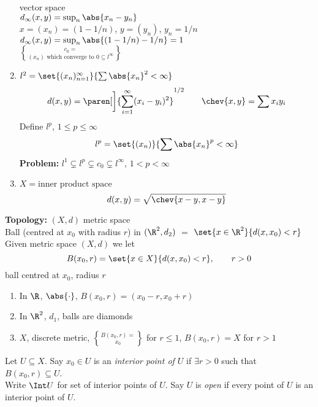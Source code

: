 \begin{enumerate}
vector space \\
$d_\infty(x,y)=\sup_n\abs{x_n-y_n}$ \\
\ex $x=(x_n)=(1-1/n)$, $y=(y_n)$, $y_n=1/n$ \\
$d_\infty(x,y)=\sup_n\abs{(1-1/n)-1/n}=1$ \\
$c_0=\brace{\text{$(x_n)$ which converge to $0$}}\subseteq l^\infty$
\item $l^2 = \set{(x_n)_{n=1}^\infty}{\vphantom{\bigm|}\smash{\sum\abs{x_n}^2<\infty}}$ \\
\[ d(x,y) = \paren[\bigg]{\sum_{i=1}^\infty(x_i-y_i)^2}^{1/2} \qquad \chev{x,y}=\sum x_iy_i \]
Define $l^p$, $1\leq p\leq \infty$
\[ l^p = \set{(x_n)}{\sum\abs{x_n}^p<\infty} \]
\textbf{Problem:} $l^1\subsetneq l^p\subsetneq c_0\subsetneq l^\infty$, $1<p<\infty$
\item $X=\text{inner product space}$
\[ d(x,y) = \sqrt{\chev{x-y,x-y}} \]
\end{enumerate}

\textbf{Topology:} $(X,d)$ metric space \\
Ball (centred at $x_0$ with radius $r$) in $(\R^2,d_2)$ $=$ $\set{x\in\R^2}{d(x,x_0)<r}$ \\
 Given metric space $(X,d)$ we let
\[ B(x_0,r) = \set{x\in X}{d(x,x_0)<r}, \qquad r>0 \]
ball centred at $x_0$, radius $r$

\ex
\begin{enumerate}
\item In $\R$, $\abs{\cdot}$, \quad $B(x_0,r)=(x_0-r,x_0+r)$
\item In $\R^2$, $d_1$, \quad balls are diamonds
\item $X$, discrete metric, \quad $B(x_0,r)=\brace{x_0}$ for $r\leq1$, $B(x_0,r)=X$ for $r>1$
\end{enumerate}

 Let $U\subseteq X$.  Say $x_0\in U$ is an \emph{interior point of $U$} if $\exists r>0$ such that $B(x_0,r)\subseteq U$. \\
Write \emph{$\Int U$} for set of interior points of $U$.  Say $U$ is \emph{open} if every point of $U$ is an interior point of $U$.

